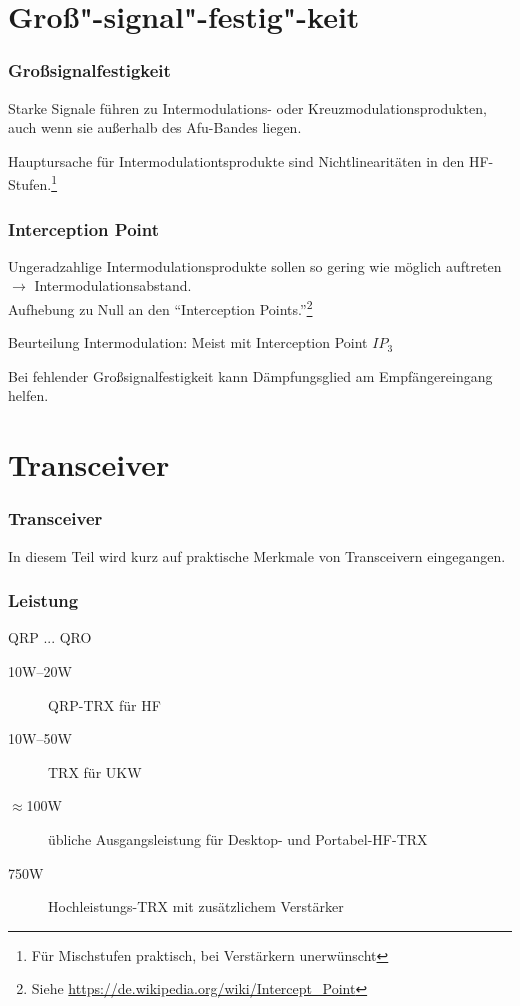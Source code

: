 \section{Groß"-signal"-festig"-keit}

\begin{frame}
  \frametitle{Großsignalfestigkeit}

  Starke Signale führen zu Intermodulations- oder Kreuzmodulationsprodukten,
  auch wenn sie außerhalb des Afu-Bandes liegen.

  \bigskip

  Hauptursache für Intermodulationtsprodukte sind Nichtlinearitäten in den
  HF-Stufen.\footnote{Für Mischstufen praktisch, bei Verstärkern unerwünscht}

\end{frame}

\begin{frame}
  \frametitle{Interception Point}

  Ungeradzahlige Intermodulationsprodukte sollen so gering wie möglich
  auftreten\\
  $\rightarrow$ Intermodulationsabstand.\\
  Aufhebung zu Null an den ``Interception Points.''\footnote{Siehe \url{https://de.wikipedia.org/wiki/Intercept_Point}}


  Beurteilung Intermodulation: Meist mit Interception Point $IP_3$

  \bigskip

  Bei fehlender Großsignalfestigkeit kann Dämpfungsglied am
  Empfängereingang helfen.

\end{frame}

\section{Transceiver}

\begin{frame}
  \frametitle{Transceiver}

  In diesem Teil wird kurz auf praktische Merkmale von Transceivern
  eingegangen.

\end{frame}

\begin{frame}
  \frametitle{Leistung}

  {\Large QRP ... QRO}

  \pause

  \begin{description}
    \item[10W--20W] QRP-TRX für HF
    \item[10W--50W] TRX für UKW
    \item[$\approx$100W] übliche Ausgangsleistung für Desktop- und Portabel-HF-TRX
    \item[750W] Hochleistungs-TRX mit zusätzlichem Verstärker
  \end{description}

\end{frame}

